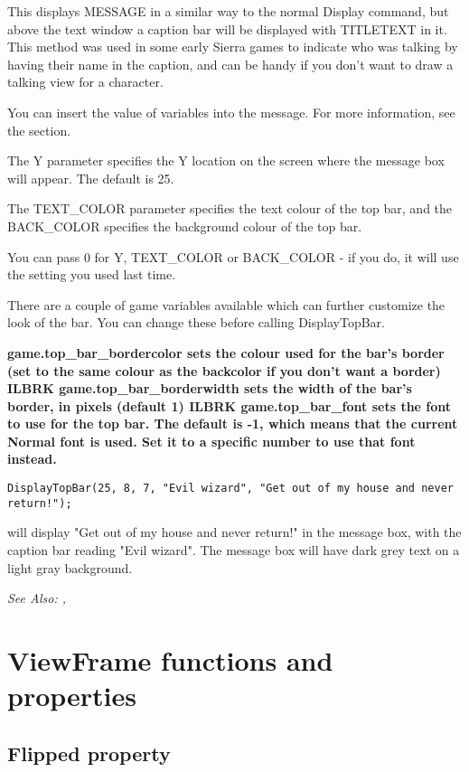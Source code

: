 This displays MESSAGE in a similar way to the normal Display command, but above the
text window a caption bar will be displayed with TITLETEXT in it. This method was
used in some early Sierra games to indicate who was talking by having their name in
the caption, and can be handy if you don't want to draw a talking view for a character.

You can insert the value of variables into the message. For more information,
see the  section.

The Y parameter specifies the Y location on the screen where the message box will appear.
The default is 25.

The TEXT_COLOR parameter specifies the text colour of the top bar, and the BACK_COLOR specifies
the background colour of the top bar.

You can pass 0 for Y, TEXT_COLOR or BACK_COLOR - if you do, it will use the setting you used
last time.

There are a couple of game variables available which can further customize the look of
the bar. You can change these before calling DisplayTopBar.

\bf{game.top_bar_bordercolor} sets the colour used for the bar's border (set to the same
colour as the backcolor if you don't want a border) ILBRK
\bf{game.top_bar_borderwidth} sets the width of the bar's border, in pixels (default 1) ILBRK
\bf{game.top_bar_font} sets the font to use for the top bar. The default is -1, which means
that the current Normal font is used. Set it to a specific number to use that font instead.

\begin{verbatim}
DisplayTopBar(25, 8, 7, "Evil wizard", "Get out of my house and never return!");
\end{verbatim}
will display "Get out of my house and never return!" in the message box, with the
caption bar reading "Evil wizard". The message box will have dark grey text on a light
gray background.

\it{See Also:} , 


\section{ViewFrame functions and properties}


\subsection{Flipped property}\label{ViewFrame.Flipped}%

